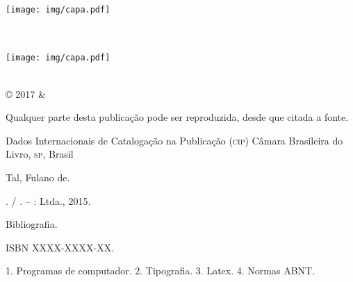 \documentclass[
12pt,				%
openright,			%
oneside,			%
a4paper,			%
brazil,				%
sumario=tradicional
]{abntex2}
\begin{document}
	\frenchspacing
	
	\frontmatter
	
	\begin{titlingpage}
		\phantom{xxx}
		\vspace{0.5cm}
		\huge
		\raggedright
		\imprimirautor\\
		\vspace{2.5cm}
		\huge 
		{\raggedleft
			\texttt{[image: img/capa.pdf]}\\[1cm]
			\textit{\textcolor{blue}{\imprimirtitulo}}\\[1cm]
		}
		\centering 
		\vfill
		\Large
		\imprimirinstituicao
	\end{titlingpage}
	
	\begin{titlingpage}
		
		\phantom{xxx}
		\vspace{0.5cm}
		\huge
		\raggedright
		\imprimirautor\\
		\vspace{2.5cm}
		\huge 
		{\raggedleft
			\texttt{[image: img/capa.pdf]}\\[1cm]
			\textit{\textcolor{blue}{\imprimirtitulo}}\\[1cm]
		}
		\centering 
		\vfill
		\Large
		\imprimirinstituicao
		
		\clearpage
		\ABNTEXfontereduzida
		© 2017 \imprimirautor \space \& \imprimirinstituicao
		
		Qualquer parte desta publicação pode ser reproduzida, desde que citada a fonte.
		
		\vspace*{\fill}
		
		\begin{center}
			Dados Internacionais de Catalogação na Publicação (\textsc{cip})
			Câmara Brasileira do Livro, \textsc{sp}, Brasil
		\end{center}
		
		\begin{mdframed}
			\noindent Tal, Fulano de.
			
			\imprimirtitulo. / \imprimirautor. -- \imprimirlocal: \imprimirinstituicao
			Ltda., 2015.
			
			\medskip
			
			Bibliografia.
			
			ISBN XXXX-XXXX-XX.
			
			\medskip
			
			1. Programas de computador. 2. Tipografia. 3. Latex. 4. Normas ABNT.
			
		\end{mdframed}
		
	\end{titlingpage}
	
\end{document}
